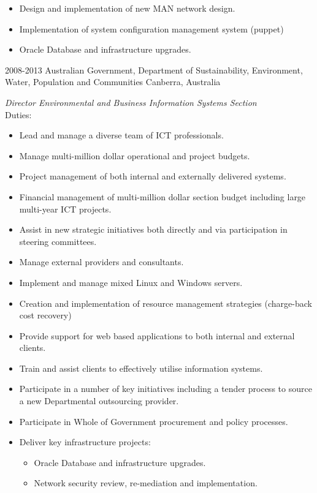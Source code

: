\documentclass[]{friggeri-cv} %
\begin{document}
{\begin{entrylist}
{\begin{itemize}
\begin{itemize}
\item Design and implementation of new MAN network design.
\item Implementation of system configuration management system (puppet)
\item Oracle Database and infrastructure upgrades.
\end{itemize}
\end{itemize}}
\entry
{2008-2013}
{Australian Government, Department of Sustainability, Environment, Water, Population and Communities}
{Canberra, Australia}
{\emph{Director Environmental and Business Information Systems Section} \\
Duties:
\begin{itemize}
\item Lead and manage a diverse team of ICT professionals.
\item Manage multi-million dollar operational and project budgets.
\item Project management of both internal and externally delivered systems.
\item Financial management of multi-million dollar section budget including large multi-year ICT projects.
\item Assist in new strategic initiatives both directly and via participation in steering committees.
\item Manage external providers and consultants.
\item Implement and manage mixed Linux and Windows servers.
\item Creation and implementation of resource management strategies (charge-back cost recovery)
\item Provide support for web based applications to both internal and external clients.
\item Train and assist clients to effectively utilise information systems.
\item Participate in a number of key initiatives including a tender process to source a new Departmental outsourcing provider.
\item Participate in Whole of Government procurement and policy processes.
\item Deliver key infrastructure projects:
\begin{itemize}
\item Oracle Database and infrastructure upgrades.
\item Network security review, re-mediation and implementation.
\end{itemize}
\end{itemize}}
\end{entrylist}}
\end{document}
